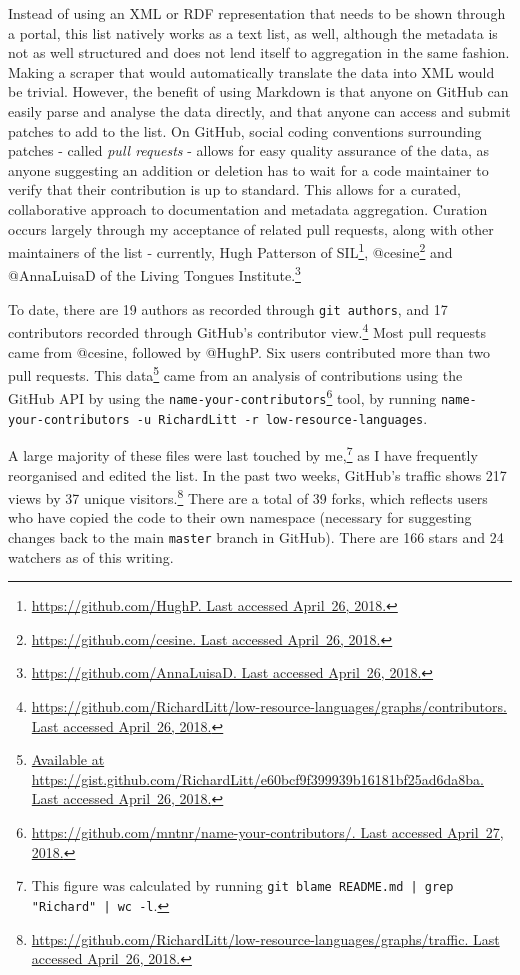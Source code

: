 Instead of using an XML or RDF representation that needs to be shown through a portal, this list natively works as a text list, as well, although the metadata is not as well structured and does not lend itself to aggregation in the same fashion. Making a scraper that would automatically translate the data into XML would be trivial. However, the benefit of using Markdown is that anyone on GitHub can easily parse and analyse the data directly, and that anyone can access and submit patches to add to the list. On GitHub, social coding conventions surrounding patches - called {\it pull requests} - allows for easy quality assurance of the data, as anyone suggesting an addition or deletion has to wait for a code maintainer to verify that their contribution is up to standard. This allows for a curated, collaborative approach to documentation and metadata aggregation. Curation occurs largely through my acceptance of related pull requests, along with other maintainers of the list - currently, Hugh Patterson of SIL\footnote{\href{https://github.com/HughP}{https://github.com/HughP. Last accessed April~26, 2018.}}, @cesine\footnote{\href{https://github.com/cesine}{https://github.com/cesine. Last accessed April~26, 2018.}} and @AnnaLuisaD of the Living Tongues Institute.\footnote{\href{https://github.com/AnnaLuisaD}{https://github.com/AnnaLuisaD. Last accessed April~26, 2018.}}

To date, there are 19 authors as recorded through {\tt git authors}, and 17 contributors recorded through GitHub's contributor view.\footnote{\href{https://github.com/RichardLitt/low-resource-languages/graphs/contributors}{https://github.com/RichardLitt/low-resource-languages/graphs/contributors. Last accessed April~26, 2018.}} Most pull requests came from @cesine, followed by @HughP. Six users contributed more than two pull requests. This data\footnote{\href{https://gist.github.com/RichardLitt/e60bcf9f399939b16181bf25ad6da8ba}{Available at https://gist.github.com/RichardLitt/e60bcf9f399939b16181bf25ad6da8ba. Last accessed April~26, 2018.}} came from an analysis of contributions using the GitHub API by using the {\tt name-your-contributors}\footnote{\href{https://github.com/mntnr/name-your-contributors/}{https://github.com/mntnr/name-your-contributors/. Last accessed April~27, 2018.}} tool, by running {\tt name-your-contributors -u RichardLitt -r low-resource-languages}.

A large majority of these files were last touched by me,\footnote{This figure was calculated by running {\tt git blame README.md | grep "Richard" | wc -l}.} as I have frequently reorganised and edited the list. In the past two weeks, GitHub's traffic shows 217 views by 37 unique visitors.\footnote{\href{https://github.com/RichardLitt/low-resource-languages/graphs/traffic}{https://github.com/RichardLitt/low-resource-languages/graphs/traffic. Last accessed April~26, 2018.}} There are a total of 39 forks, which reflects users who have copied the code to their own namespace (necessary for suggesting changes back to the main {\tt master} branch in GitHub). There are 166 stars and 24 watchers as of this writing.

